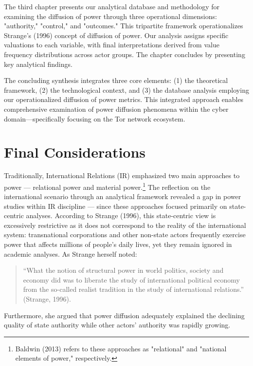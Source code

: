 The third chapter presents our analytical database and methodology for examining the diffusion of power through three operational dimensions: "authority," "control," and "outcomes." This tripartite framework operationalizes Strange's (1996) concept of diffusion of power. Our analysis assigns specific valuations to each variable, with final interpretations derived from value frequency distributions across actor groups. The chapter concludes by presenting key analytical findings.

The concluding synthesis integrates three core elements: (1) the theoretical framework, (2) the technological context, and (3) the database analysis employing our operationalized diffusion of power metrics. This integrated approach enables comprehensive examination of power diffusion phenomena within the cyber domain—specifically focusing on the Tor network ecosystem.

\section{Final Considerations}
Traditionally, International Relations (IR) emphasized two main approaches to power --- relational power and material power.\footnote{Baldwin (2013) refers to these approaches as "relational" and "national elements of power," respectively.} The reflection on the international scenario through an analytical framework revealed a gap in power studies within IR discipline --- since these approaches focused primarily on state-centric analyses. According to Strange (1996), this state-centric view is excessively restrictive as it does not correspond to the reality of the international system: transnational corporations and other non-state actors frequently exercise power that affects millions of people's daily lives, yet they remain ignored in academic analyses. As Strange herself noted: 

\begin{quote}
``What the notion of structural power in world politics, society and economy did was to liberate the study of international political economy from the so-called realist tradition in the study of international relations.'' (Strange, 1996).
\end{quote}

Furthermore, she argued that power diffusion adequately explained the declining quality of state authority while other actors' authority was rapidly growing.

